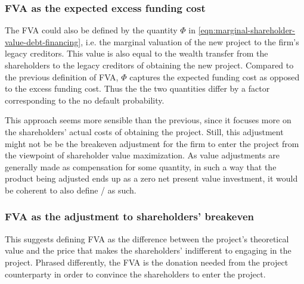 \documentclass[../main.tex]{subfiles}
\begin{document}
        \subsubsection{FVA as the expected excess funding cost}
            The FVA could also be defined by the quantity $\Phi$ in \cref{eqn:marginal-shareholder-value-debt-financing}, 
            i.e. the marginal valuation of the new project to the firm's legacy creditors. 
            This value is also equal to the wealth transfer from the shareholders to the legacy creditors
            of obtaining the new project.
            Compared to the previous definition of FVA, 
            $\Phi$ captures the expected funding cost as opposed to the excess funding cost.
            Thus the the two quantities differ by a factor corresponding to the no default probability.

            This approach seems more sensible than the previous, 
            since it focuses more on the shareholders' actual costs of obtaining the project.
            Still, this adjustment might not be be the breakeven adjustment
            for the firm to enter the project from the viewpoint of shareholder value maximization.
            As value adjustments are generally made as compensation for some quantity,
            in such a way that the product being adjusted ends up as a zero net present value investment,
            it would be coherent to also define \FVA/ as such.
            
        \subsubsection{FVA as the adjustment to shareholders' breakeven}
            This suggests defining FVA as the difference between the project's theoretical value
            and the price that makes the shareholders' indifferent to engaging in the project.
            Phrased differently, the FVA is the donation needed from the project counterparty in order
            to convince the shareholders to enter the project.
\end{document}
